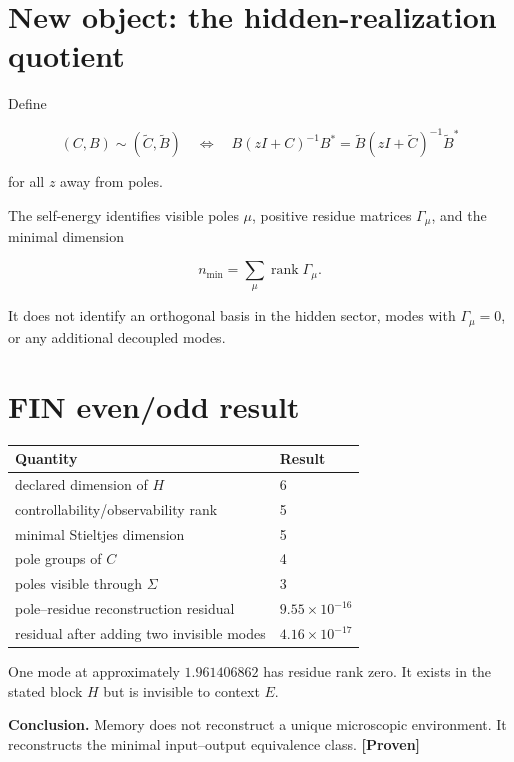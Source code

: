 \documentclass[11pt,a4paper,openany]{report}
\newcommand{\statusProven}{\textcolor{fingreen}{[Proven]}}
\begin{document}
\section{New object: the hidden-realization quotient}

Define

\[
(C,B)\sim(\widetilde C,\widetilde B)
\quad\Longleftrightarrow\quad
B(zI+C)^{-1}B^\ast
=
\widetilde B(zI+\widetilde C)^{-1}\widetilde B^\ast
\]

for all \(z\) away from poles.

The self-energy identifies visible poles \(\mu\), positive residue matrices \(\Gamma_\mu\), and the minimal dimension

\[
n_{\min}=\sum_\mu\operatorname{rank}\Gamma_\mu.
\]

It does not identify an orthogonal basis in the hidden sector, modes with \(\Gamma_\mu=0\), or any additional decoupled modes.

\section{FIN even/\allowbreak{}odd result}

\begin{center}
\begingroup\small
\setlength{\tabcolsep}{2.5pt}
\renewcommand{\arraystretch}{1.16}
\begin{longtable}{@{}p{}p{}@{}}
\toprule
\textbf{Quantity} & \textbf{Result} \\
\midrule
\endhead
declared dimension of \(H\) & 6 \\
controllability/\allowbreak{}observability rank & 5 \\
minimal Stieltjes dimension & 5 \\
pole groups of \(C\) & 4 \\
poles visible through \(\Sigma\) & 3 \\
pole--residue reconstruction residual & \(9.55\times10^{-16}\) \\
residual after adding two invisible modes & \(4.16\times10^{-17}\) \\
\bottomrule
\end{longtable}
\endgroup
\end{center}

One mode at approximately \(1.961406862\) has residue rank zero. It exists in the stated block \(H\) but is invisible to context \(E\).

\textbf{Conclusion.} Memory does not reconstruct a unique microscopic environment. It reconstructs the minimal input--output equivalence class. \textbf{\statusProven{}}
\end{document}

